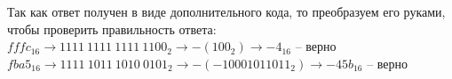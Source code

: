 \documentclass[12pt]{article}
\begin{document}
	\noindent Так как ответ получен в виде дополнительного кода, то преобразуем его руками, чтобы проверить правильность ответа: \newline
	$fffc_{16} \to 1111\ 1111\ 1111\ 1100_2 \to -(100_2) \to -4_{16}$ -- верно \newline
	$fba5_{16} \to 1111\ 1011\ 1010\ 0101_2 \to -(-10001011011_2) \to -45b_{16}$ -- верно
	
\end{document}
